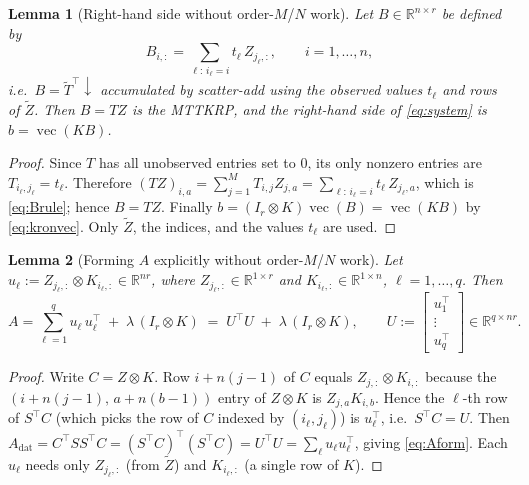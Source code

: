 \documentclass[12pt]{article}
\DeclareMathOperator{\vecop}{vec}
\newcommand{\bR}{\mathbb{R}}
\newtheorem{lemma}{Lemma}
\theoremstyle{remark}
\begin{document}
\begin{lemma}[Right-hand side without order-$M$/$N$ work]\label{lem:rhs}
Let $B\in\bR^{n\times r}$ be defined by
\begin{equation}\label{eq:Brule}
  B_{i,:}=\sum_{\ell:\,i_\ell=i} t_\ell\, Z_{j_\ell,:},\qquad i=1,\dots,n,
\end{equation}
i.e.\ $B = \tilde T^{\!\top}\!\!\downarrow$ accumulated by scatter-add using the observed values $t_\ell$ and rows of $\tilde Z$. Then $B=TZ$ is the MTTKRP, and the right-hand side of \eqref{eq:system} is $b=\vecop(KB)$.
\end{lemma}

\begin{proof}
Since $T$ has all unobserved entries set to $0$, its only nonzero entries are $T_{i_\ell,j_\ell}=t_\ell$. Therefore
$(TZ)_{i,a}=\sum_{j=1}^M T_{i,j}Z_{j,a}=\sum_{\ell:\,i_\ell=i} t_\ell\,Z_{j_\ell,a}$,
which is \eqref{eq:Brule}; hence $B=TZ$. Finally $b=(I_r\otimes K)\vecop(B)=\vecop(KB)$ by \eqref{eq:kronvec}. Only $\tilde Z$, the indices, and the values $t_\ell$ are used.
\end{proof}

\begin{lemma}[Forming $A$ explicitly without order-$M$/$N$ work]\label{lem:form}
Let $u_\ell := Z_{j_\ell,:}\otimes K_{i_\ell,:}\in\bR^{nr}$, where $Z_{j_\ell,:}\in\bR^{1\times r}$ and $K_{i_\ell,:}\in\bR^{1\times n}$, $\ell=1,\dots,q$. Then
\begin{equation}\label{eq:Aform}
  A = \sum_{\ell=1}^q u_\ell\, u_\ell^{\!\top} \;+\; \lambda\,(I_r\otimes K)
  \;=\; U^{\!\top}U \;+\; \lambda\,(I_r\otimes K),\qquad U:=\begin{bmatrix}u_1^{\!\top}\\ \vdots\\ u_q^{\!\top}\end{bmatrix}\in\bR^{q\times nr}.
\end{equation}
\end{lemma}

\begin{proof}
Write $C=Z\otimes K$. Row $i+n(j-1)$ of $C$ equals $Z_{j,:}\otimes K_{i,:}$ because the $(i+n(j-1),\,a+n(b-1))$ entry of $Z\otimes K$ is $Z_{j,a}K_{i,b}$. Hence the $\ell$-th row of $S^{\!\top}C$ (which picks the row of $C$ indexed by $(i_\ell,j_\ell)$) is $u_\ell^{\!\top}$, i.e.\ $S^{\!\top}C=U$. Then $A_{\mathrm{dat}}=C^{\!\top}SS^{\!\top}C=(S^{\!\top}C)^{\!\top}(S^{\!\top}C)=U^{\!\top}U=\sum_\ell u_\ell u_\ell^{\!\top}$, giving \eqref{eq:Aform}. Each $u_\ell$ needs only $Z_{j_\ell,:}$ (from $\tilde Z$) and $K_{i_\ell,:}$ (a single row of $K$).
\end{proof}
\end{document}
